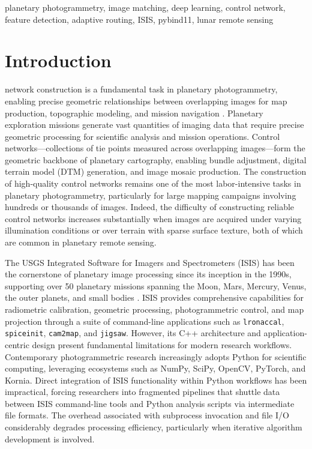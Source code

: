 \documentclass[lettersize,journal]{IEEEtran}
\begin{document}
\begin{IEEEkeywords}
planetary photogrammetry, image matching, deep learning, control network, feature detection, adaptive routing, ISIS, pybind11, lunar remote sensing
\end{IEEEkeywords}


\section{Introduction}
 network construction is a fundamental task in planetary photogrammetry, enabling precise geometric relationships between overlapping images for map production, topographic modeling, and mission navigation \cite{archinal2018iau,robinson2010lroc}. Planetary exploration missions generate vast quantities of imaging data that require precise geometric processing for scientific analysis and mission operations. Control networks—collections of tie points measured across overlapping images—form the geometric backbone of planetary cartography, enabling bundle adjustment, digital terrain model (DTM) generation, and image mosaic production. The construction of high-quality control networks remains one of the most labor-intensive tasks in planetary photogrammetry, particularly for large mapping campaigns involving hundreds or thousands of images. Indeed, the difficulty of constructing reliable control networks increases substantially when images are acquired under varying illumination conditions or over terrain with sparse surface texture, both of which are common in planetary remote sensing.

The USGS Integrated Software for Imagers and Spectrometers (ISIS) has been the cornerstone of planetary image processing since its inception in the 1990s, supporting over 50 planetary missions spanning the Moon, Mars, Mercury, Venus, the outer planets, and small bodies \cite{usgs2024isis}. ISIS provides comprehensive capabilities for radiometric calibration, geometric processing, photogrammetric control, and map projection through a suite of command-line applications such as \texttt{lronaccal}, \texttt{spiceinit}, \texttt{cam2map}, and \texttt{jigsaw}. However, its C++ architecture and application-centric design present fundamental limitations for modern research workflows. Contemporary photogrammetric research increasingly adopts Python for scientific computing, leveraging ecosystems such as NumPy, SciPy, OpenCV, PyTorch, and Kornia. Direct integration of ISIS functionality within Python workflows has been impractical, forcing researchers into fragmented pipelines that shuttle data between ISIS command-line tools and Python analysis scripts via intermediate file formats. The overhead associated with subprocess invocation and file I/O considerably degrades processing efficiency, particularly when iterative algorithm development is involved.
\end{document}
